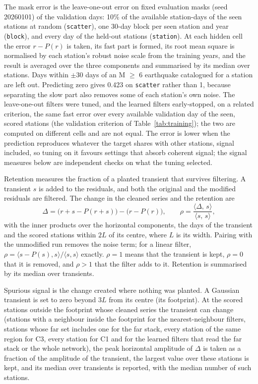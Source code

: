 \documentclass[preprint,12pt,authoryear]{elsarticle}
\begin{document}
The mask error is the leave-one-out error on fixed evaluation masks (seed 20260101) of the validation days: 10\% of the available station-days of the seen stations at random (\texttt{scatter}), one 30-day block per seen station and year (\texttt{block}), and every day of the held-out stations (\texttt{station}). At each hidden cell the error $r - P(r)$ is taken, its fast part is formed, its root mean square is normalised by each station's robust noise scale from the training years, and the result is averaged over the three components and summarised by its median over stations. Days within $\pm 30$ days of an M $\ge$ 6 earthquake catalogued for a station are left out. Predicting zero gives 0.423 on \texttt{scatter} rather than 1, because separating the slow part also removes some of each station's own noise. The leave-one-out filters were tuned, and the learned filters early-stopped, on a related criterion, the same fast error over every available validation day of the seen, scored stations (the validation criterion of Table~\ref{tab:training}); the two are computed on different cells and are not equal. The error is lower when the prediction reproduces whatever the target shares with other stations, signal included, so tuning on it favours settings that absorb coherent signal; the signal measures below are independent checks on what the tuning selected.

Retention measures the fraction of a planted transient that survives filtering. A transient $s$ is added to the residuals, and both the original and the modified residuals are filtered. The change in the cleaned series and the retention are
\begin{equation}
  \Delta = \big(r + s - P(r+s)\big) - \big(r - P(r)\big),
  \qquad
  \rho = \frac{\langle \Delta,\, s \rangle}{\langle s,\, s \rangle},
  \label{eq:retention}
\end{equation}
with the inner products over the horizontal components, the days of the transient and the scored stations within $2L$ of its centre, where $L$ is its width. Pairing with the unmodified run removes the noise term; for a linear filter, $\rho = \langle s - P(s), s\rangle / \langle s, s \rangle$ exactly. $\rho = 1$ means that the transient is kept, $\rho = 0$ that it is removed, and $\rho > 1$ that the filter adds to it. Retention is summarised by its median over transients.

Spurious signal is the change created where nothing was planted. A Gaussian transient is set to zero beyond $3L$ from its centre (its footprint). At the scored stations outside the footprint whose cleaned series the transient can change (stations with a neighbour inside the footprint for the nearest-neighbour filters, stations whose far set includes one for the far stack, every station of the same region for C3, every station for C1 and for the learned filters that read the far stack or the whole network), the peak horizontal amplitude of $\Delta$ is taken as a fraction of the amplitude of the transient, the largest value over these stations is kept, and its median over transients is reported, with the median number of such stations.
\end{document}
